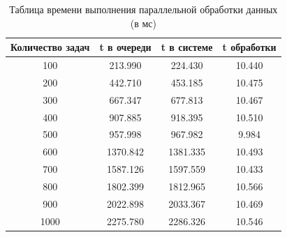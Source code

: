 \documentclass[12pt]{report}
\begin{document}
\begin{table} [h!]
	\caption{Таблица времени выполнения параллельной обработки данных (в мс)}
	\label{tableComp}
	\begin{center}
		\begin{tabular}{|c c c c|} 
		 	\hline
			Количество задач & t в очереди & t в системе & t обработки \\  
			\hline
            100 & 213.990 & 224.430 & 10.440 \\
            \hline
            200 & 442.710 & 453.185 & 10.475 \\
            \hline
            300 & 667.347 & 677.813 & 10.467 \\
            \hline
            400 & 907.885 & 918.395 & 10.510 \\
            \hline
            500 & 957.998 & 967.982 & 9.984 \\
            \hline
            600 & 1370.842 & 1381.335 & 10.493 \\
            \hline
            700 & 1587.126 & 1597.559 & 10.433 \\
            \hline
            800 & 1802.399 & 1812.965 & 10.566 \\
            \hline
            900 & 2022.898 & 2033.367 & 10.469 \\
            \hline
            1000 & 2275.780 & 2286.326 & 10.546 \\
			\hline
		\end{tabular}
	\end{center}
\end{table}
\newpage
\end{document}
